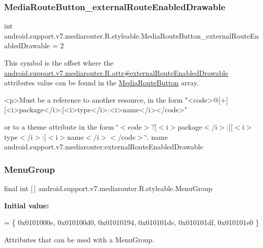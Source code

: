 \subsubsection{\texorpdfstring{Media\+Route\+Button\+\_\+external\+Route\+Enabled\+Drawable}{MediaRouteButton\_externalRouteEnabledDrawable}}
{\footnotesize\ttfamily int android.\+support.\+v7.\+mediarouter.\+R.\+styleable.\+Media\+Route\+Button\+\_\+external\+Route\+Enabled\+Drawable = 2\hspace{0.3cm}{\ttfamily [static]}}

This symbol is the offset where the \hyperlink{classandroid_1_1support_1_1v7_1_1mediarouter_1_1R_1_1attr_ad05965c94dd069d89708ec50e1b52c53}{android.\+support.\+v7.\+mediarouter.\+R.\+attr\#external\+Route\+Enabled\+Drawable} attribute\textquotesingle{}s value can be found in the \hyperlink{classandroid_1_1support_1_1v7_1_1mediarouter_1_1R_1_1styleable_a3ffcf56e5764450d86df9877ffb66258}{Media\+Route\+Button} array.

\begin{DoxyVerb}      <p>Must be a reference to another resource, in the form "<code>@[+][<i>package</i>:]<i>type</i>:<i>name</i></code>"
\end{DoxyVerb}
 or to a theme attribute in the form \char`\"{}$<$code$>$?\mbox{[}$<$i$>$package$<$/i$>$\+:\mbox{]}\mbox{[}$<$i$>$type$<$/i$>$\+:\mbox{]}$<$i$>$name$<$/i$>$$<$/code$>$\char`\"{}.  name android.\+support.\+v7.\+mediarouter\+:external\+Route\+Enabled\+Drawable \mbox{\label{classandroid_1_1support_1_1v7_1_1mediarouter_1_1R_1_1styleable_a0bae5cf4aace765b3bb99d32de6ce7ff}} 
\subsubsection{\texorpdfstring{Menu\+Group}{MenuGroup}}
{\footnotesize\ttfamily final int \mbox{[}$\,$\mbox{]} android.\+support.\+v7.\+mediarouter.\+R.\+styleable.\+Menu\+Group\hspace{0.3cm}{\ttfamily [static]}}

{\bfseries Initial value\+:}
\begin{DoxyCode}
= \{
            0x0101000e, 0x010100d0, 0x01010194, 0x010101de,
            0x010101df, 0x010101e0
        \}
\end{DoxyCode}
Attributes that can be used with a Menu\+Group. 

